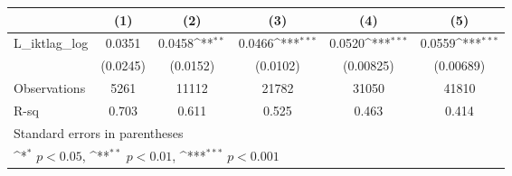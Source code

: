 {
\def\sym#1{\ifmmode^{#1}\else\(^{#1}\)\fi}
\begin{tabular}{l*{5}{c}}
\hline\hline
                &\multicolumn{1}{c}{(1)}         &\multicolumn{1}{c}{(2)}         &\multicolumn{1}{c}{(3)}         &\multicolumn{1}{c}{(4)}         &\multicolumn{1}{c}{(5)}         \\
\hline
L\_iktlag\_log    &   0.0351         &   0.0458\sym{**} &   0.0466\sym{***}&   0.0520\sym{***}&   0.0559\sym{***}\\
                & (0.0245)         & (0.0152)         & (0.0102)         &(0.00825)         &(0.00689)         \\
\hline
Observations    &     5261         &    11112         &    21782         &    31050         &    41810         \\
R-sq            &    0.703         &    0.611         &    0.525         &    0.463         &    0.414         \\
\hline\hline
\multicolumn{6}{l}{\footnotesize Standard errors in parentheses}\\
\multicolumn{6}{l}{\footnotesize \sym{*} \(p<0.05\), \sym{**} \(p<0.01\), \sym{***} \(p<0.001\)}\\
\end{tabular}
}
